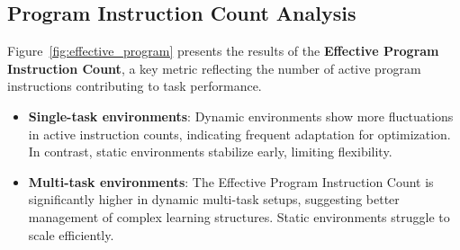 \documentclass[sigconf]{acmart}
\begin{document}
\subsection{Program Instruction Count Analysis}
Figure~\ref{fig:effective_program} presents the results of the \textbf{Effective Program Instruction Count}, a key metric reflecting the number of active 
program instructions contributing to task performance.

\begin{itemize}
  \item \textbf{Single-task environments}: Dynamic environments show more fluctuations in active instruction counts, indicating frequent adaptation for optimization. In contrast, static environments stabilize early, limiting flexibility.
  \item \textbf{Multi-task environments}: The Effective Program Instruction Count is significantly higher in dynamic multi-task setups, suggesting better management of complex learning structures. Static environments struggle to scale efficiently.
\end{itemize}
\end{document}
